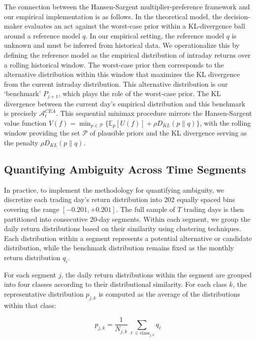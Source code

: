 \documentclass[preprint,12pt,authoryear]{elsarticle}
\renewcommand{\textcolor}[2]{\begingroup\color{#1}#2\endgroup}
\begin{document}
\textcolor{red}{The connection between the Hansen-Sargent multiplier-preference framework and our empirical implementation is as follows. In the theoretical model, the decision-maker evaluates an act against the worst-case prior within a KL-divergence ball around a reference model $q$. In our empirical setting, the reference model $q$ is unknown and must be inferred from historical data. We operationalize this by defining the reference model as the empirical distribution of intraday returns over a rolling historical window. The worst-case prior then corresponds to the alternative distribution within this window that maximizes the KL divergence from the current intraday distribution. This alternative distribution is our `benchmark' $P_{j+1}$, which plays the role of the worst-case prior. The KL divergence between the current day's empirical distribution and this benchmark is precisely $\mathcal{A}^{CEA}_t$. This sequential minimax procedure mirrors the Hansen-Sargent value function $V(f) = \min_{p \in \mathcal{P}} \{\mathbb{E}_p[U(f)] + \rho D_{KL}(p\|q)\}$, with the rolling window providing the set $\mathcal{P}$ of plausible priors and the KL divergence serving as the penalty $\rho D_{KL}(p\|q)$.}

\subsection{Quantifying Ambiguity Across Time Segments}

In practice, to implement the methodology for quantifying ambiguity, we discretize each trading day's return distribution into 202 equally spaced bins covering the range \([-0.201, +0.201]\). The full sample of \(T\) trading days is then partitioned into consecutive 20-day segments. Within each segment, we group the daily return distributions based on their similarity using clustering techniques. Each distribution within a segment represents a potential alternative or candidate distribution, while the benchmark distribution remains fixed as the monthly return distribution \(q_i\).

For each segment \(j\), the daily return distributions within the segment are grouped into four classes according to their distributional similarity. For each class \(k\), the representative distribution \(p_{j,k}\) is computed as the average of the distributions within that class:

\begin{equation*}
p_{j,k} = \frac{1}{N_{j,k}} \sum_{\ell \in \text{class}_{j,k}} q_{\ell}
\end{equation*}
\end{document}
